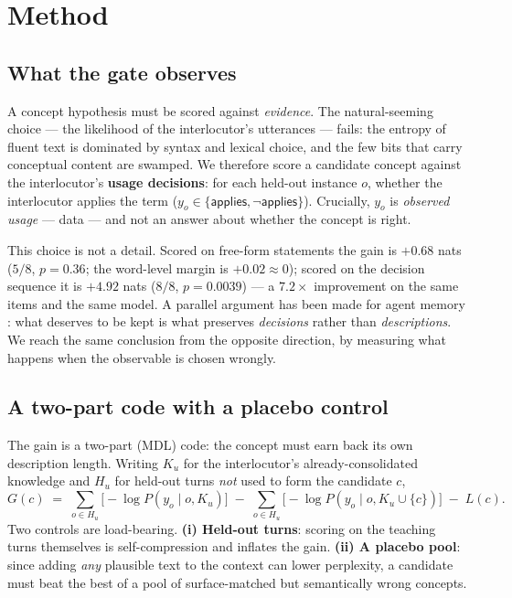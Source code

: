 \documentclass[11pt]{article}
\begin{document}
\section{Method}

\subsection{What the gate observes}
\label{sec:observable}

A concept hypothesis must be scored against \emph{evidence}. The natural-seeming choice ---
the likelihood of the interlocutor's utterances --- fails: the entropy of fluent text is
dominated by syntax and lexical choice, and the few bits that carry conceptual content are
swamped. We therefore score a candidate concept against the interlocutor's \textbf{usage
decisions}: for each held-out instance $o$, whether the interlocutor applies the term
($y_o \in \{\textsf{applies}, \neg\textsf{applies}\}$). Crucially, $y_o$ is
\emph{observed usage} --- data --- and not an answer about whether the concept is right.

This choice is not a detail. Scored on free-form statements the gain is $+0.68$ nats
($5/8$, $p{=}0.36$; the word-level margin is $+0.02 \approx 0$); scored on the decision
sequence it is $+4.92$ nats ($8/8$, $p{=}0.0039$) --- a $7.2\times$ improvement on the same
items and the same model. A parallel argument has been made for agent memory
\citep{zou2026demem}: what deserves to be kept is what preserves \emph{decisions} rather
than \emph{descriptions}. We reach the same conclusion from the opposite direction, by
measuring what happens when the observable is chosen wrongly.

\subsection{A two-part code with a placebo control}

The gain is a two-part (MDL) code: the concept must earn back its own description length.
Writing $K_u$ for the interlocutor's already-consolidated knowledge and $H_u$ for held-out
turns \emph{not} used to form the candidate $c$,
\begin{equation}
G(c) \;=\; \sum_{o \in H_u} \big[-\log P(y_o \mid o, K_u)\big]
        \;-\; \sum_{o \in H_u} \big[-\log P(y_o \mid o, K_u \cup \{c\})\big]
        \;-\; L(c).
\label{eq:gain}
\end{equation}
Two controls are load-bearing. \textbf{(i) Held-out turns}: scoring on the teaching turns
themselves is self-compression and inflates the gain. \textbf{(ii) A placebo pool}: since
adding \emph{any} plausible text to the context can lower perplexity, a candidate must beat
the best of a pool of surface-matched but semantically wrong concepts.
\end{document}
